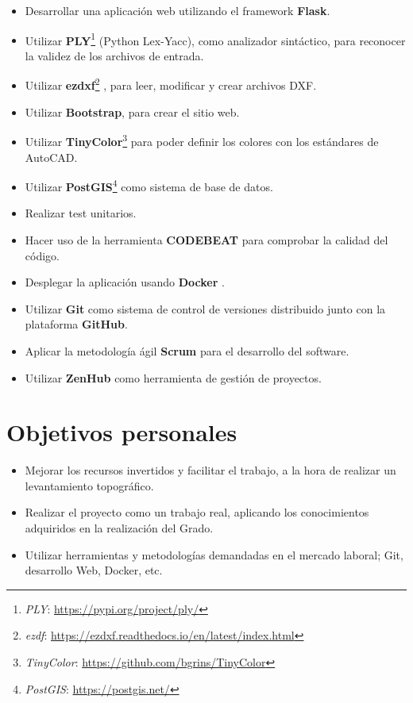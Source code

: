 \begin{itemize}
\item Desarrollar una aplicación web utilizando el framework \textbf {Flask}.

\item Utilizar \textbf {PLY}\footnote{\textsl{PLY}: \url{https://pypi.org/project/ply/}}   (Python Lex-Yacc), como analizador sintáctico, para reconocer la validez de los archivos de entrada.

\item Utilizar \textbf {ezdxf}\footnote{\textsl{ezdf}: \url{https://ezdxf.readthedocs.io/en/latest/index.html}}  ,  para leer, modificar y crear archivos DXF. 

\item Utilizar \textbf {Bootstrap}, para crear el sitio web.

\item Utilizar \textbf {TinyColor}\footnote{\textsl{TinyColor}: \url{https://github.com/bgrins/TinyColor}} para poder definir los colores con los estándares de AutoCAD.

\item Utilizar  \textbf {PostGIS}\footnote{\textsl{PostGIS}: \url{https://postgis.net/}} como sistema de base de datos.

\item Realizar test unitarios.

\item Hacer uso de la herramienta \textbf {CODEBEAT} para comprobar la calidad del código.

\item Desplegar la aplicación usando \textbf {Docker} .

\item Utilizar \textbf {Git} como sistema de control de versiones distribuido junto con la plataforma \textbf {GitHub}.

\item Aplicar la metodología ágil \textbf {Scrum} para el desarrollo del software.

\item Utilizar \textbf {ZenHub} como herramienta de gestión de proyectos.
\end{itemize}

\section{Objetivos personales}
\begin{itemize}
\item Mejorar los recursos invertidos y facilitar el trabajo, a la hora de realizar un levantamiento topográfico.

\item Realizar el proyecto como un trabajo real, aplicando los conocimientos adquiridos en la realización del Grado.

\item Utilizar herramientas y metodologías demandadas en el mercado laboral; Git, desarrollo Web, Docker, etc.
\end{itemize}